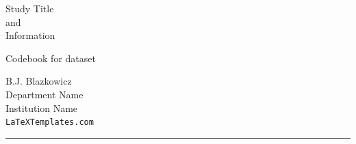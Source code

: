 \documentclass[
]{article}
\author{}
\date{\vspace{-2.5em}}
\begin{document}
\setlength{\footskip}{-1pt}


\begin{titlepage} %


    
    
    \colorbox{titlecolor}{
        \parbox[t]{0.93\textwidth}{ %
            \parbox[t]{0.91\textwidth}{ %
                \raggedleft %
                \fontsize{50pt}{80pt}\selectfont %
                \vspace{0.7cm} %
                
                Study Title\\
                and\\
                Information\\
             \vspace{4cm}
            
                Codebook for dataset\\
                
                \vspace{0.7cm} %
            }
        }
    }
    
    \vfill %
    
    
    \parbox[t]{0.93\textwidth}{ %
        \raggedleft %
        \Large %
        {\Large B.J. Blazkowicz}\\[4pt] %
        Department Name\\
        Institution Name\\[4pt] %
        \texttt{LaTeXTemplates.com}\\
        
        \hfill\rule{0.2\linewidth}{1pt}%
    }
    
\end{titlepage}
\end{document}
